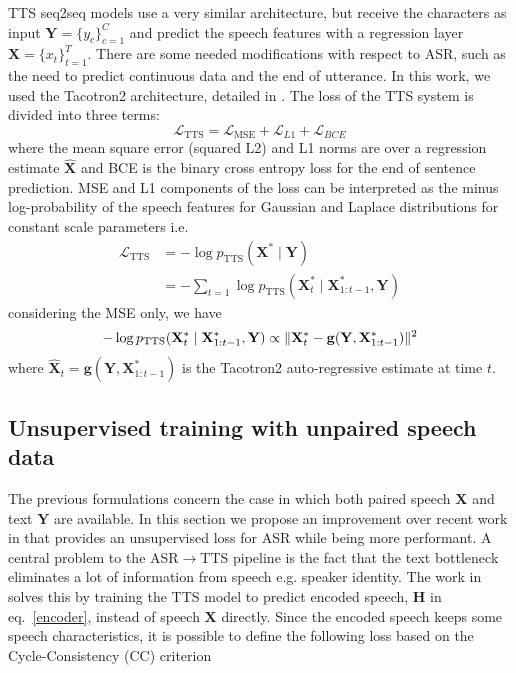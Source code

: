 \documentclass[a4paper]{article}
\begin{document}
TTS seq2seq models use a very similar architecture, but receive the characters as input $\mathbf{Y}=\{y_c\}_{c=1}^C$ and predict the speech features with a regression layer $\mathbf{X}=\{x_t\}_{t=1}^T$. There are some needed modifications with respect to ASR, such as the need to predict continuous data and the end of utterance. In this work, we used the Tacotron2 architecture, detailed in \cite{shen2018natural}. The loss of the TTS system is divided into three terms:
\begin{equation}
\mathcal{L}_{\mathrm{TTS}}=\mathcal{L}_{\mathrm{MSE}} + \mathcal{L}_{L1} + \mathcal{L}_{BCE} \label{eq:4}
\end{equation}
where the mean square error (squared L2) and L1 norms are over a regression estimate $\hat{\mathbf{X}}$ and BCE is the binary cross entropy loss for the end of sentence prediction. MSE and L1 components of the loss can be interpreted as the minus log-probability of the speech features for Gaussian and Laplace distributions for constant scale parameters i.e.
\begin{align}
\mathcal{L}_{\mathrm{TTS}} &= -\log p_{\mathrm{TTS}}(\mathbf{X}^*\mid\mathbf{Y})\\\nonumber &= -\sum_{t=1}\log p_{\mathrm{TTS}}(\mathbf{X}^*_t\mid\mathbf{X}^*_{1:t-1}, \mathbf{Y})\label{eq:5}
\end{align}
considering the MSE only, we have
\begin{equation}
-\log p_{\mathrm{TTS}}(\mathbf{X}^*_t\mid\mathbf{X}^*_{1:t-1}, \mathbf{Y}) \propto\\ \|\mathbf{X}^*_t - \mathbf{g}(\mathbf{\mathbf{Y}}, \mathbf{X}^*_{1:t-1}) \|^2
\end{equation}
where $\hat{\mathbf{X}}_t = \mathbf{g}(\mathbf{Y}, \mathbf{X}^*_{1:t-1})$ is the Tacotron2 auto-regressive estimate at time $t$.

\subsection{Unsupervised training with unpaired speech data}

The previous formulations concern the case in which both paired speech $\mathbf{X}$ and text $\mathbf{Y}$ are available. 
In this section we propose an improvement over recent work in \cite{hori2018cycle} that provides an unsupervised loss for ASR while being more performant. A central problem to the ASR$\rightarrow$TTS pipeline is the fact that the text bottleneck eliminates a lot of information from speech e.g. speaker identity. The work in~\cite{hori2018cycle} solves this by training the TTS model to predict encoded speech, $\mathbf{H}$ in eq.~\eqref{encoder}, instead of speech $\mathbf{X}$ directly. Since the encoded speech keeps some speech characteristics, it is possible to define the following loss based on the Cycle-Consistency (CC) criterion 
\end{document}
